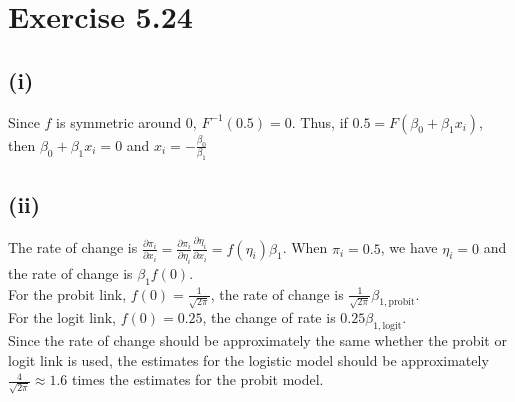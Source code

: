 \vspace{\baselineskip}
\section*{Exercise 5.24}
\subsection*{(i)}
Since $f$ is symmetric around $0$, $F^{-1}(0.5) = 0$. Thus, if $0.5 = F(\beta_{0} + \beta_{1}x_{i})$, then $\beta_{0} + \beta_{1}x_{i} = 0$ and $x_{i} = -\frac{\beta_{0}}{\beta_{1}}$

\subsection*{(ii)}
The rate of change is $\frac{\partial \pi_{i}}{\partial x_{i}} = \frac{\partial \pi_{i}}{\partial \eta_{i}}\frac{\partial \eta_{i}}{\partial x_{i}} = f(\eta_{i})\beta_{1}$. When $\pi_{i} = 0.5$, we have $\eta_{i} = 0$ and the rate of change is $\beta_{1}f(0)$.\\

For the probit link, $f(0) = \frac{1}{\sqrt{2\pi}}$, the rate of change is $\frac{1}{\sqrt{2\pi}}\beta_{1,\mathrm{probit}}$.\\
For the logit link, $f(0) = 0.25$, the change of rate is $0.25\beta_{1,\mathrm{logit}}$.\\

Since the rate of change should be approximately the same whether the probit or logit link is used, the estimates for the logistic model should be approximately $\frac{4}{\sqrt{2\pi}} \approx 1.6$ times the estimates for the probit model.